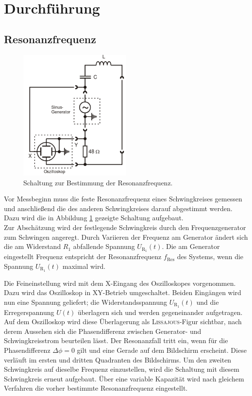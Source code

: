 \section{Durchführung}
\label{sec:Durchfuehrung}
\subsection{Resonanzfrequenz}
\label{sec:Resonanzfrequenz}
\begin{figure}[h]
	\centering
		\includegraphics[width=0.5\textwidth]{Bilder/Resonanzfrequenz.pdf}
		\caption{Schaltung zur Bestimmung der Resonanzfrequenz. \cite{v355}} 
\label{fig:resonanzfrequenz}
\end{figure}
Vor Messbeginn muss die feste Resonanzfrequenz eines Schwingkreises gemessen und anschließend die des anderen Schwingkreises darauf abgestimmt werden. 
Dazu wird die in Abbildung \ref{fig:resonanzfrequenz} gezeigte Schaltung aufgebaut. \\
Zur Abschätzung wird der festlegende Schwingkreis durch den Frequenzgenerator zum Schwingen angeregt. 
Durch Variieren der Frequenz am Generator ändert sich die am Widerstand $R_1$ abfallende Spannung $U_\mathup{R_1}(t)$. 
Die am Generator eingestellt Frequenz entspricht der Resonanzfrequenz $f_\mathup{Res}$ des Systems, wenn die Spannung $U_\mathup{R_1}(t)$ maximal wird.

Die Feineinstellung wird mit dem X-Eingang des Oszilloskopes vorgenommen.
Dazu wird das Oszilloskop in XY-Betrieb umgeschaltet. 
Beiden Eingängen wird nun eine Spannung geliefert; 
die Widerstandsspannung $U_\mathup{R_1}(t)$ und die Erregerspannung $U(t)$ überlagern sich und werden gegeneinander aufgetragen. 
Auf dem Oszilloskop wird diese Überlagerung als \textsc{Lissajous}-Figur sichtbar, nach derem Aussehen sich die Phasendifferenz zwischen Generator- und Schwingkreisstrom beurteilen lässt. 
Der Resonanzfall tritt ein, wenn für die Phasendifferenz $\Delta{\phi}=0$  gilt und eine Gerade auf dem Bildschirm erscheint. 
Diese verläuft im ersten und dritten Quadranten des Bildschirms.
Um den zweiten Schwingkreis auf dieselbe Frequenz einzustellen, wird die Schaltung mit diesem Schwingkreis erneut aufgebaut. 
Über eine variable Kapazität wird nach gleichem Verfahren die vorher bestimmte Resonanzfrequenz eingestellt.

